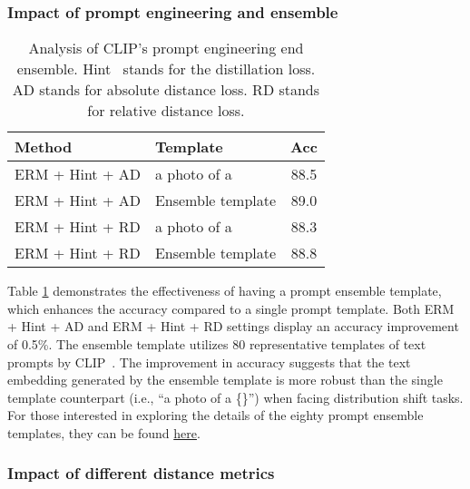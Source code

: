 \documentclass[10pt,twocolumn,letterpaper]{article}
\begin{document}
\subsubsection{Impact of prompt engineering and ensemble}

\begin{table}[htbp]
\begin{center}
\footnotesize
\begin{tabular}{l |l |c }
\hline
Method & Template  & Acc \\
\hline \hline
ERM + Hint + AD & a photo of a  & 88.5 \\
\rowcolor{lightgray!30}ERM + Hint + AD & Ensemble template & 89.0 \\
\hline
ERM + Hint + RD & a photo of a  & 88.3 \\
\rowcolor{lightgray!30}ERM + Hint + RD & Ensemble template &  88.8\\
\hline
\end{tabular}
\vspace{5pt}
\caption{Analysis of CLIP's prompt engineering end ensemble. Hint~\cite{hinton2015distilling} stands for the distillation loss. AD stands for absolute distance loss. RD stands for relative distance loss.}
\label{table:prompt}
\end{center}
\end{table}
Table \ref{table:prompt} demonstrates the effectiveness of having a prompt ensemble template, which enhances the accuracy compared to a single prompt template. Both ERM + Hint + AD and ERM + Hint + RD settings display an accuracy improvement of 0.5\%. The ensemble template utilizes 80 representative templates of text prompts by CLIP~\cite{radford2021learning}. The improvement in accuracy suggests that the text embedding generated by the ensemble template is more robust than the single template counterpart (i.e., ``a photo of a \{\}'') when facing distribution shift tasks. 
For those interested in exploring the details of the eighty prompt ensemble templates, they can be found \href{https://github.com/openai/CLIP/blob/main/notebooks/Prompt_Engineering_for_ImageNet.ipynb}{here}.


 

\subsubsection{Impact of different distance metrics}
\end{document}
